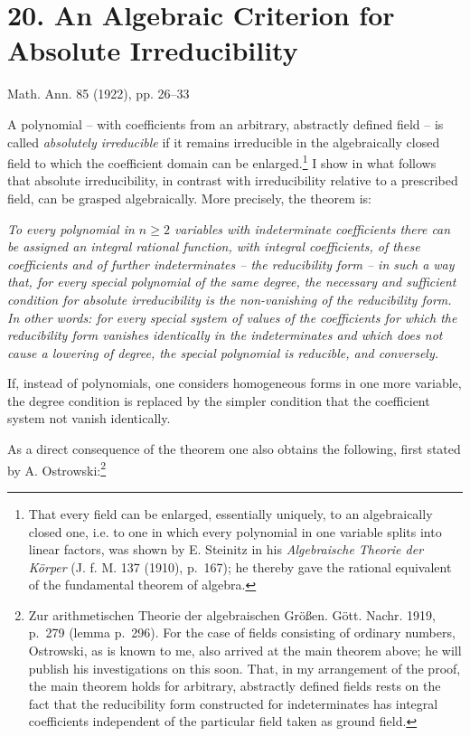 ﻿\setcounter{footnote}{0}
\section*{20. An Algebraic Criterion for Absolute Irreducibility}
\begin{center}
Math. Ann. 85 (1922), pp. 26--33
\end{center}

A polynomial -- with coefficients from an arbitrary, abstractly defined field -- is called \emph{absolutely irreducible} if it remains irreducible in the algebraically closed field to which the coefficient domain can be enlarged.\footnote{That every field can be enlarged, essentially uniquely, to an algebraically closed one, i.e. to one in which every polynomial in one variable splits into linear factors, was shown by E. Steinitz in his \emph{Algebraische Theorie der Körper} (J. f. M. 137 (1910), p.~167); he thereby gave the rational equivalent of the fundamental theorem of algebra.} I show in what follows that absolute irreducibility, in contrast with irreducibility relative to a prescribed field, can be grasped algebraically. More precisely, the theorem is:

\emph{To every polynomial in $n\ge2$ variables with indeterminate coefficients there can be assigned an integral rational function, with integral coefficients, of these coefficients and of further indeterminates -- the reducibility form -- in such a way that, for every special polynomial of the same degree, the necessary and sufficient condition for absolute irreducibility is the non-vanishing of the reducibility form. In other words: for every special system of values of the coefficients for which the reducibility form vanishes identically in the indeterminates and which does not cause a lowering of degree, the special polynomial is reducible, and conversely.}

If, instead of polynomials, one considers homogeneous forms in one more variable, the degree condition is replaced by the simpler condition that the coefficient system not vanish identically.

As a direct consequence of the theorem one also obtains the following, first stated by A. Ostrowski:\footnote{Zur arithmetischen Theorie der algebraischen Größen. Gött. Nachr. 1919, p.~279 (lemma p.~296). For the case of fields consisting of ordinary numbers, Ostrowski, as is known to me, also arrived at the main theorem above; he will publish his investigations on this soon. That, in my arrangement of the proof, the main theorem holds for arbitrary, abstractly defined fields rests on the fact that the reducibility form constructed for indeterminates has integral coefficients independent of the particular field taken as ground field.}

